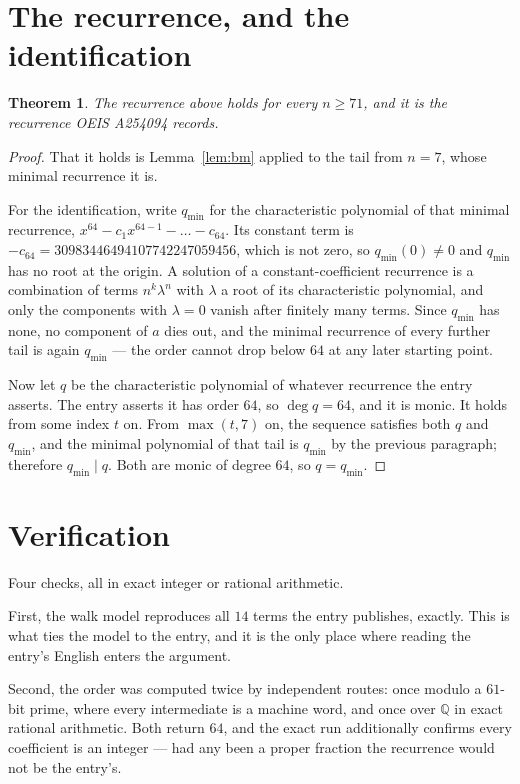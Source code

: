 \documentclass[11pt,a4paper]{article}
\theoremstyle{plain}
\newtheorem{theorem}{Theorem}
\theoremstyle{definition}
\begin{document}
\section{The recurrence, and the identification}

\begin{theorem}
The recurrence above holds for every $n\ge71$, and it is the recurrence OEIS A254094 records.
\end{theorem}

\begin{proof}
That it holds is Lemma~\ref{lem:bm} applied to the tail from $n=7$, whose minimal
recurrence it is.

For the identification, write $q_{\min}$ for the characteristic polynomial of that minimal
recurrence, $x^{64}-c_1x^{64-1}-\dots-c_{64}$. Its constant term is
$-c_{64}=30983446494107742247059456$, which is not zero, so $q_{\min}(0)\neq0$ and $q_{\min}$ has no
root at the origin. A solution of a constant-coefficient recurrence is a combination of terms
$n^{k}\lambda^{n}$ with $\lambda$ a root of its characteristic polynomial, and only the
components with $\lambda=0$ vanish after finitely many terms. Since $q_{\min}$ has none, no
component of $a$ dies out, and the minimal recurrence of every further tail is again
$q_{\min}$ --- the order cannot drop below $64$ at any later starting point.

Now let $q$ be the characteristic polynomial of whatever recurrence the entry asserts. The
entry asserts it has order $64$, so $\deg q=64$, and it is monic. It holds from some
index $t$ on. From $\max(t,7)$ on, the sequence satisfies both $q$ and $q_{\min}$, and
the minimal polynomial of that tail is $q_{\min}$ by the previous paragraph; therefore
$q_{\min}\mid q$. Both are monic of degree $64$, so $q=q_{\min}$.
\end{proof}

\section{Verification}

Four checks, all in exact integer or rational arithmetic.

First, the walk model reproduces all $14$ terms the entry publishes, exactly. This is
what ties the model to the entry, and it is the only place where reading the entry's English
enters the argument.

Second, the order was computed twice by independent routes: once modulo a $61$-bit prime, where
every intermediate is a machine word, and once over $\mathbb{Q}$ in exact rational arithmetic.
Both return $64$, and the exact run additionally confirms every coefficient is an integer
--- had any been a proper fraction the recurrence would not be the entry's.
\end{document}

